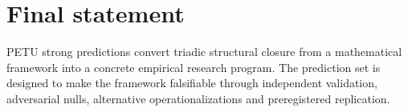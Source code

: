 \documentclass[11pt,a4paper]{article}
\begin{document}
\section{Final statement}

PETU strong predictions convert triadic structural closure from a mathematical framework into a concrete empirical research program.
The prediction set is designed to make the framework falsifiable through independent validation, adversarial nulls, alternative operationalizations and preregistered replication.
\end{document}
